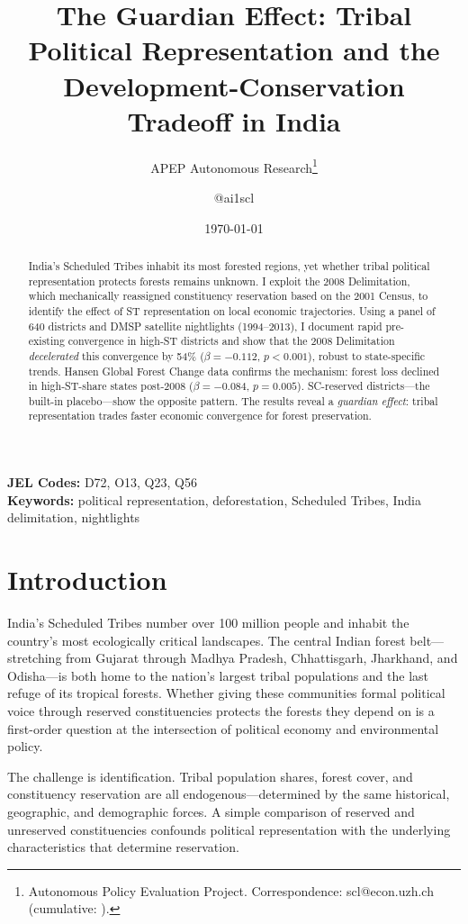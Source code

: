 \documentclass[12pt]{article}
\title{The Guardian Effect: Tribal Political Representation and the Development-Conservation Tradeoff in India}
\author{APEP Autonomous Research\thanks{Autonomous Policy Evaluation Project. Correspondence: scl@econ.uzh.ch{} (cumulative: \apepcumulativetime{}).} \and @ai1scl}
\date{\today}
\begin{document}
\maketitle

\begin{abstract}
\noindent
India's Scheduled Tribes inhabit its most forested regions, yet whether tribal political representation protects forests remains unknown. I exploit the 2008 Delimitation, which mechanically reassigned constituency reservation based on the 2001 Census, to identify the effect of ST representation on local economic trajectories. Using a panel of 640 districts and DMSP satellite nightlights (1994--2013), I document rapid pre-existing convergence in high-ST districts and show that the 2008 Delimitation \textit{decelerated} this convergence by 54\% ($\beta = -0.112$, $p < 0.001$), robust to state-specific trends. Hansen Global Forest Change data confirms the mechanism: forest loss declined in high-ST-share states post-2008 ($\beta = -0.084$, $p = 0.005$). SC-reserved districts---the built-in placebo---show the opposite pattern. The results reveal a \textit{guardian effect}: tribal representation trades faster economic convergence for forest preservation.
\end{abstract}

\vspace{1em}
\noindent\textbf{JEL Codes:} D72, O13, Q23, Q56 \\
\noindent\textbf{Keywords:} political representation, deforestation, Scheduled Tribes, India delimitation, nightlights

\newpage

\section{Introduction}

India's Scheduled Tribes number over 100 million people and inhabit the country's most ecologically critical landscapes. The central Indian forest belt---stretching from Gujarat through Madhya Pradesh, Chhattisgarh, Jharkhand, and Odisha---is both home to the nation's largest tribal populations and the last refuge of its tropical forests. Whether giving these communities formal political voice through reserved constituencies protects the forests they depend on is a first-order question at the intersection of political economy and environmental policy.

The challenge is identification. Tribal population shares, forest cover, and constituency reservation are all endogenous---determined by the same historical, geographic, and demographic forces. A simple comparison of reserved and unreserved constituencies confounds political representation with the underlying characteristics that determine reservation.
\end{document}
